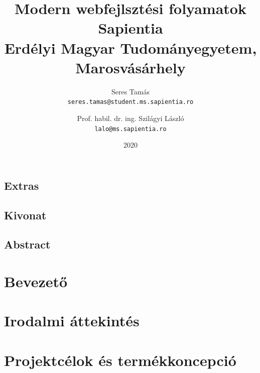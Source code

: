 \documentclass[12pt, twosides]{report}
\title{
	{Modern webfejlsztési folyamatok}\\
	{\large Sapientia\\
	Erdélyi Magyar Tudományegyetem, Marosvásárhely}
}
\author{
	Seres Tamás\\
	\texttt{seres.tamas@student.ms.sapientia.ro}
	\and
	Prof. habil. dr. ing. Szilágyi László\\
	\texttt{lalo@ms.sapientia.ro}
}
\date{2020}
\begin{document}






% 

\section*{Extras}

\pagebreak

\section*{Kivonat}

\pagebreak

\section*{Abstract}

\pagebreak

\tableofcontents

\listoffigures

\chapter{Bevezető}


\chapter{Irodalmi áttekintés}


\chapter{Projektcélok és termékkoncepció}










\end{document}
